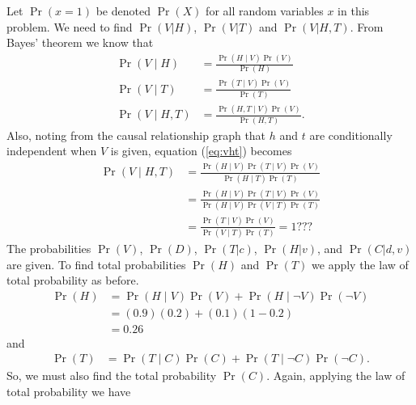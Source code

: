 \documentclass[letterpaper]{amsart}
\begin{document}
Let
$\Pr(x = 1)$
be denoted
$\Pr(X)$
for all random variables $x$ in this problem. We need to find
$\Pr(V| H)$,
$\Pr(V| T)$
and
$\Pr(V| H, T)$.
From Bayes' theorem we know that
\begin{align}
  \Pr(V\mid H) &= \frac{\Pr(H\mid V)\Pr(V)}{\Pr(H)} \\
  \Pr(V\mid T) &= \frac{\Pr(T\mid V)\Pr(V)}{\Pr(T)} \\
  \Pr(V\mid H, T) &= \frac{\Pr(H, T\mid V)\Pr(V)}{\Pr(H,T)} \label{eq:vht}.
\end{align}
Also, noting from the causal relationship graph that $h$ and $t$ are conditionally independent when \(V\) is given, equation (\ref{eq:vht}) becomes
\begin{align}
  \Pr(V\mid H, T) &= \frac{\Pr(H\mid V)\Pr(T\mid V)\Pr(V)}{\Pr(H\mid T)\Pr(T)}
  \\
  &=
    \frac{\Pr(H\mid V)\Pr(T\mid V)\Pr(V)}
    {\Pr(H\mid V)\Pr(V \mid T)\Pr(T)}
  \\
  &=
    \frac{\Pr(T\mid V)\Pr(V)}
    {\Pr(V \mid T)\Pr(T)} = 1???
\end{align}
The probabilities
$\Pr(V)$,
$\Pr(D)$,
$\Pr(T|c)$,
$\Pr(H|v)$,
and
$\Pr(C|d,v)$
are given. To find total probabilities $\Pr(H)$ and $\Pr(T)$
we apply the law of total probability as before.
\begin{align*}
  \Pr(H) &= \Pr(H\mid V)\Pr(V) +\Pr(H\mid\neg V)\Pr(\neg V)\\
  &= (0.9)(0.2)+(0.1)(1 - 0.2)\\
  &= 0.26
\end{align*}
and
\begin{align*}
  \Pr(T) &= \Pr(T\mid C)\Pr(C) +\Pr(T\mid\neg C)\Pr(\neg C).
\end{align*}
So, we must also find the total probability $\Pr(C)$.
Again, applying the law of total probability we have
\end{document}
